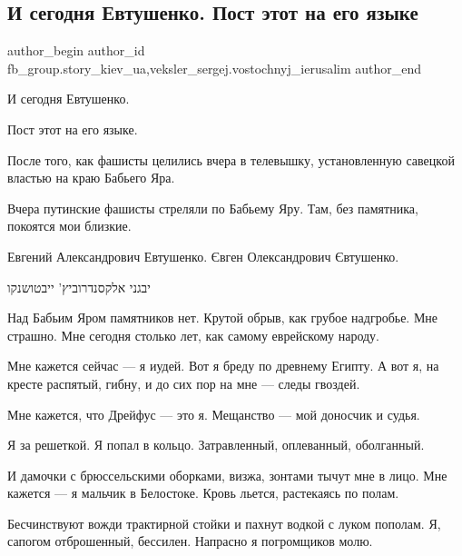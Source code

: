  
 
 
 
 
 
\subsection{И сегодня Евтушенко. Пост этот на его языке}
\label{sec:02_03_2022.fb.fb_group.story_kiev_ua.1.evtushenko_televyshka}
 
\ifcmt
 author_begin
   author_id fb_group.story_kiev_ua,veksler_sergej.vostochnyj_ierusalim
 author_end
\fi

И сегодня Евтушенко.

Пост этот на его языке.

После того, как фашисты целились вчера в телевышку, установленную савецкой
властью на краю Бабьего Яра.

Вчера путинские фашисты стреляли по Бабьему Яру. Там, без памятника, покоятся
мои близкие.

Евгений Александрович Евтушенко. Євген Олександрович Євтушенко.

יבגני אלקסנדרוביץ' ייבטושנקו

Над Бабьим Яром памятников нет.
Крутой обрыв, как грубое надгробье.
Мне страшно.
Мне сегодня столько лет,
как самому еврейскому народу.

Мне кажется сейчас —
я иудей.
Вот я бреду по древнему Египту.
А вот я, на кресте распятый, гибну,
и до сих пор на мне — следы гвоздей.

Мне кажется, что Дрейфус —
это я.
Мещанство —
мой доносчик и судья.

Я за решеткой.
Я попал в кольцо.
Затравленный,
оплеванный,
оболганный.

И дамочки с брюссельскими оборками,
визжа, зонтами тычут мне в лицо.
Мне кажется —
я мальчик в Белостоке.
Кровь льется, растекаясь по полам.

Бесчинствуют вожди трактирной стойки
и пахнут водкой с луком пополам.
Я, сапогом отброшенный, бессилен.
Напрасно я погромщиков молю.


